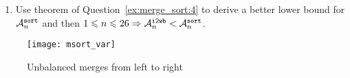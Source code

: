 \begin{enumerate}
  \item \label{ex:merge_sort:10} Use theorem of
    Question~\ref{ex:merge_sort:4} to derive a better lower bound for
    \(\ave{sort}{n}\) and then \(1 \leqslant n \leqslant 26
    \Rightarrow \ave{i2wb}{n} < \ave{sort}{n}\).

\end{enumerate}
\begin{figure}[!b]
\centering
\texttt{[image: msort\_var]}
\caption{Unbalanced merges from left to right\label{fig:msort_var}}
\end{figure}


